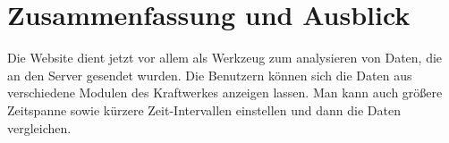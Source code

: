 \chapter{Zusammenfassung und Ausblick}\thispagestyle{fancy}

\large{Die Website dient jetzt vor allem als Werkzeug zum analysieren von Daten, die an den Server gesendet wurden. Die Benutzern können sich die Daten aus verschiedene Modulen des Kraftwerkes anzeigen lassen. Man kann auch größere Zeitspanne sowie kürzere Zeit-Intervallen einstellen und dann die Daten vergleichen.}